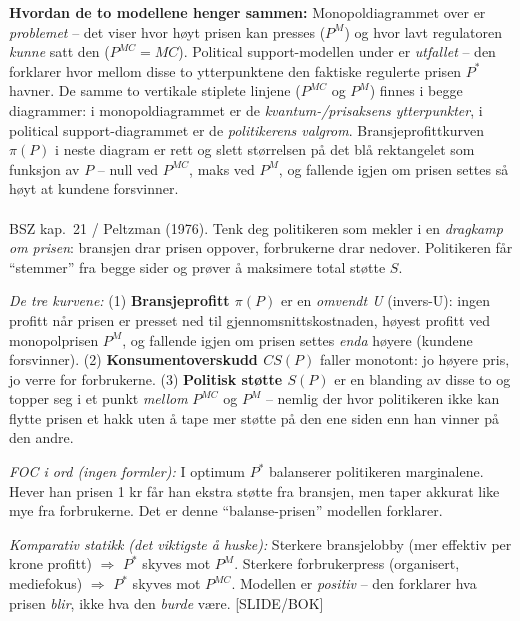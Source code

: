 \begin{tcolorbox}[colback=yellow!6, colframe=orange!60!black, boxrule=0.4pt, arc=2pt, left=6pt, right=6pt, top=4pt, bottom=4pt]
\textbf{Hvordan de to modellene henger sammen:} Monopoldiagrammet over er \emph{problemet} -- det viser hvor høyt prisen kan presses ($P^M$) og hvor lavt regulatoren \emph{kunne} satt den ($P^{MC}=MC$). Political support-modellen under er \emph{utfallet} -- den forklarer hvor mellom disse to ytterpunktene den faktiske regulerte prisen $P^*$ havner. De samme to vertikale stiplete linjene ($P^{MC}$ og $P^M$) finnes i begge diagrammer: i monopoldiagrammet er de \emph{kvantum-/prisaksens ytterpunkter}, i political support-diagrammet er de \emph{politikerens valgrom}. Bransjeprofittkurven $\pi(P)$ i neste diagram er rett og slett størrelsen på det blå rektangelet som funksjon av $P$ -- null ved $P^{MC}$, maks ved $P^M$, og fallende igjen om prisen settes så høyt at kundene forsvinner.
\end{tcolorbox}

\paragraph{\quad\SOne}
BSZ kap.\ 21 / Peltzman (1976). Tenk deg politikeren som mekler i en \emph{dragkamp om prisen}: bransjen drar prisen oppover, forbrukerne drar nedover. Politikeren får ``stemmer'' fra begge sider og prøver å maksimere total støtte $S$.

\textit{De tre kurvene:} (1) \textbf{Bransjeprofitt $\pi(P)$} er en \emph{omvendt U} (invers-U): ingen profitt når prisen er presset ned til gjennomsnittskostnaden, høyest profitt ved monopolprisen $P^M$, og fallende igjen om prisen settes \emph{enda} høyere (kundene forsvinner). (2) \textbf{Konsumentoverskudd $CS(P)$} faller monotont: jo høyere pris, jo verre for forbrukerne. (3) \textbf{Politisk støtte $S(P)$} er en blanding av disse to og topper seg i et punkt \emph{mellom} $P^{MC}$ og $P^M$ -- nemlig der hvor politikeren ikke kan flytte prisen et hakk uten å tape mer støtte på den ene siden enn han vinner på den andre.

\textit{FOC i ord (ingen formler):} I optimum $P^*$ balanserer politikeren marginalene. Hever han prisen 1 kr får han ekstra støtte fra bransjen, men taper akkurat like mye fra forbrukerne. Det er denne ``balanse-prisen'' modellen forklarer.

\textit{Komparativ statikk (det viktigste å huske):} Sterkere bransjelobby (mer effektiv per krone profitt) $\Rightarrow$ $P^*$ skyves mot $P^M$. Sterkere forbrukerpress (organisert, mediefokus) $\Rightarrow$ $P^*$ skyves mot $P^{MC}$. Modellen er \emph{positiv} -- den forklarer hva prisen \emph{blir}, ikke hva den \emph{burde} være. [SLIDE/BOK]

